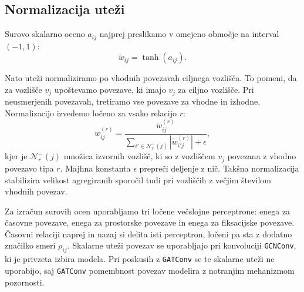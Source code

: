 

\subsection{Normalizacija uteži}


Surovo skalarno oceno $a_{ij}$ najprej preslikamo v omejeno območje na interval $(-1, 1)$:
\begin{equation}
    \tilde{w}_{ij} = \tanh(a_{ij}).
\end{equation}

Nato uteži normaliziramo po vhodnih povezavah ciljnega vozlišča. 
To pomeni, da za vozlišče $v_j$ upoštevamo povezave, ki imajo $v_j$ za ciljno vozlišče.
Pri neusmerjenih povezavah, tretiramo vse povezave za vhodne in izhodne.
Normalizacijo izvedemo ločeno za vsako relacijo $r$:
\begin{equation}
    w_{ij}^{(r)} =
    \frac{\tilde{w}_{ij}^{(r)}}
    {\sum_{i' \in \mathcal{N}^{-}_r(j)}
    |\tilde{w}_{i'j}^{(r)}| + \epsilon},
\end{equation}
kjer je $\mathcal{N}^{-}_r(j)$ množica izvornih vozlišč, ki so z vozliščem $v_j$ povezana z vhodno povezavo tipa $r$.
Majhna konstanta $\epsilon$ prepreči deljenje z nič.
Takšna normalizacija stabilizira velikost agregiranih sporočil tudi pri vozliščih z večjim številom vhodnih povezav.

Za izračun surovih ocen uporabljamo tri ločene večslojne perceptrone: enega za časovne povezave, enega za prostorske povezave in enega za fiksacijske povezave.
Časovni relaciji naprej in nazaj si delita isti perceptron, ločeni pa sta z dodatno značilko smeri $\rho_{ij}$.
Skalarne uteži povezav se uporabljajo pri konvoluciji \texttt{GCNConv}, ki je privzeta izbira modela.
Pri poskusih z \texttt{GATConv} se te skalarne uteži ne uporabijo, saj \texttt{GATConv} pomembnost povezav modelira z notranjim mehanizmom pozornosti.

